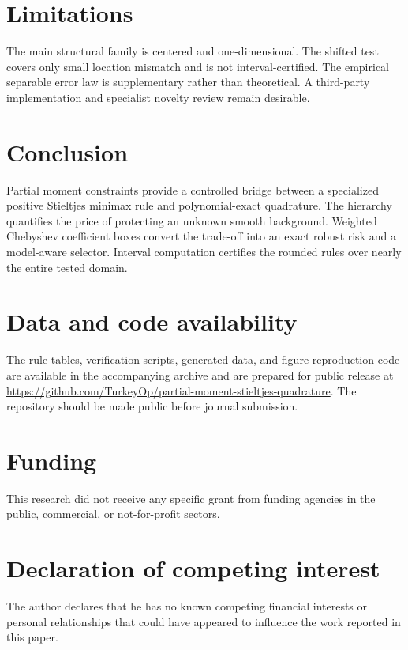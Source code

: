 \documentclass[preprint,12pt]{elsarticle}
\theoremstyle{remark}
\begin{document}
\section{Limitations}

The main structural family is centered and one-dimensional. The shifted
test covers only small location mismatch and is not interval-certified.
The empirical separable error law is supplementary rather than
theoretical. A third-party implementation and specialist novelty review
remain desirable.

\section{Conclusion}

Partial moment constraints provide a controlled bridge between a
specialized positive Stieltjes minimax rule and polynomial-exact
quadrature. The hierarchy quantifies the price of protecting an unknown
smooth background. Weighted Chebyshev coefficient boxes convert the
trade-off into an exact robust risk and a model-aware selector. Interval
computation certifies the rounded rules over nearly the entire tested
domain.

\section*{Data and code availability}

The rule tables, verification scripts, generated data, and figure
reproduction code are available in the accompanying archive and are
prepared for public release at
\url{https://github.com/TurkeyOp/partial-moment-stieltjes-quadrature}.
The repository should be made public before journal submission.

\section*{Funding}

This research did not receive any specific grant from funding agencies
in the public, commercial, or not-for-profit sectors.

\section*{Declaration of competing interest}

The author declares that he has no known competing financial interests
or personal relationships that could have appeared to influence the
work reported in this paper.
\end{document}
